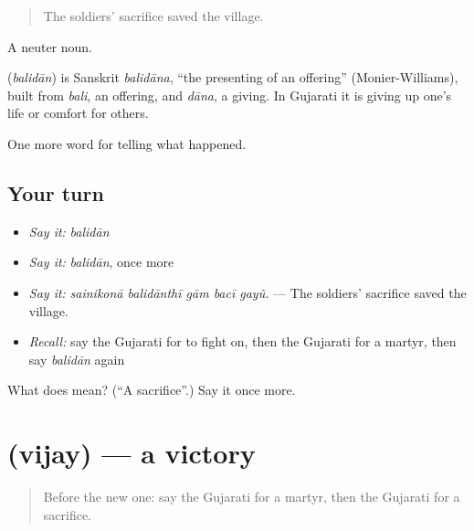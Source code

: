 \begin{quote}
The soldiers' sacrifice saved the village.
\end{quote}

A neuter noun.

\begin{cousinweb}
\textbf{} (\emph{balidān}) is Sanskrit \emph{balidāna}, \textquotedblleft{}the presenting of an offering\textquotedblright{} (Monier-Williams), built from \emph{bali}, an offering, and \emph{dāna}, a giving. In Gujarati it is giving up one's life or comfort for others.
\end{cousinweb}

\begin{grammarlens}[title={What you've built}]
One more word for telling what happened.
\end{grammarlens}

\subsection*{Your turn}
\begin{itemize}
\raggedright
  \item \emph{Say it:} \emph{balidān}
  \item \emph{Say it:} \emph{balidān}, once more
  \item \emph{Say it:} \emph{sainikonā balidānthī gām bacī gayũ.} — The soldiers' sacrifice saved the village.
  \item \emph{Recall:} say the Gujarati for to fight on, then the Gujarati for a martyr, then say \emph{balidān} again
\end{itemize}

\begin{tcolorbox}[breakable,colback=teal!4,colframe=teal!35!black,title={Before you move on}]
What does  mean? (\textquotedblleft{}A sacrifice\textquotedblright{}.) Say it once more.
\end{tcolorbox}
\section[\texorpdfstring{\gu{વિજય} (vijay)}{વિજય (vijay)}]{ (vijay) — a victory}

\label{lesson:GU-C323-vijay}



\begin{quote}
Before the new one: say the Gujarati for a martyr, then the Gujarati for a sacrifice.
\end{quote}

